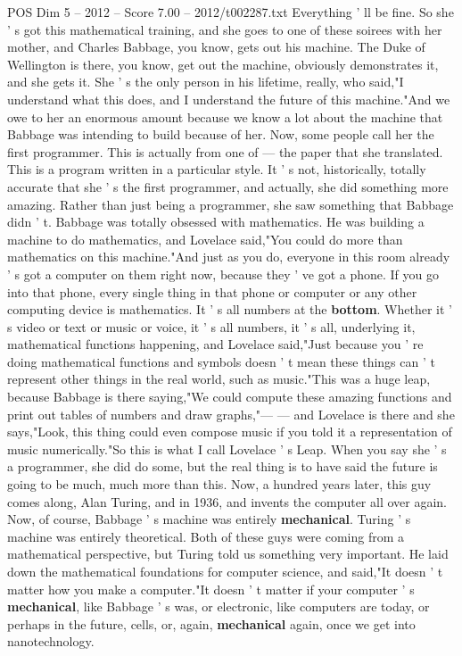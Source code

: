 \begin{textsample}{POS Dim 5 – 2012 – Score 7.00 – 2012/t002287.txt}
Everything ' ll be fine.
So she ' s got this mathematical training, and she goes to one of these soirees with her mother, and Charles Babbage, you know, gets out his machine.
The Duke of Wellington is there, you know, get out the machine, obviously demonstrates it, and she gets it.
She ' s the only person in his lifetime, really, who said,"I understand what this does, and I understand the future of this machine."And we owe to her an enormous amount because we know a lot about the machine that Babbage was intending to build because of her.
Now, some people call her the first programmer.
This is actually from one of — the paper that she translated.
This is a program written in a particular style.
It ' s not, historically, totally accurate that she ' s the first programmer, and actually, she did something more amazing.
Rather than just being a programmer, she saw something that Babbage didn ' t.
Babbage was totally obsessed with mathematics.
He was building a machine to do mathematics, and Lovelace said,"You could do more than mathematics on this machine."And just as you do, everyone in this room already ' s got a computer on them right now, because they ' ve got a phone.
If you go into that phone, every single thing in that phone or computer or any other computing device is mathematics.
It ' s all numbers at the \textbf{bottom}.
Whether it ' s video or text or music or voice, it ' s all numbers, it ' s all, underlying it, mathematical functions happening, and Lovelace said,"Just because you ' re doing mathematical functions and symbols doesn ' t mean these things can ' t represent other things in the real world, such as music."This was a huge leap, because Babbage is there saying,"We could compute these amazing functions and print out tables of numbers and draw graphs,"— — and Lovelace is there and she says,"Look, this thing could even compose music if you told it a representation of music numerically."So this is what I call Lovelace ' s Leap.
When you say she ' s a programmer, she did do some, but the real thing is to have said the future is going to be much, much more than this.
Now, a hundred years later, this guy comes along, Alan Turing, and in 1936, and invents the computer all over again.
Now, of course, Babbage ' s machine was entirely \textbf{mechanical}.
Turing ' s machine was entirely theoretical.
Both of these guys were coming from a mathematical perspective, but Turing told us something very important.
He laid down the mathematical foundations for computer science, and said,"It doesn ' t matter how you make a computer."It doesn ' t matter if your computer ' s \textbf{mechanical}, like Babbage ' s was, or electronic, like computers are today, or perhaps in the future, cells, or, again, \textbf{mechanical} again, once we get into nanotechnology.

\end{textsample}
